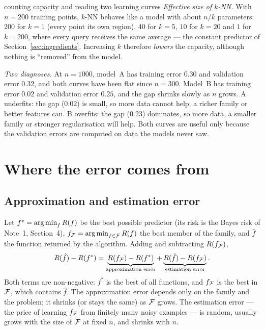 \documentclass[11pt]{article}
\begin{document}
\begin{worked}{counting capacity and reading two learning curves}
\emph{Effective size of $k$-NN.} With $n = 200$ training points, $k$-NN behaves like a model with about $n/k$
parameters: $200$ for $k = 1$ (every point its own region), $40$ for $k = 5$, $10$ for $k = 20$ and $1$ for $k = 200$,
where every query receives the same average --- the constant predictor of Section~\ref{sec:ingredients}. Increasing
$k$ therefore \emph{lowers} the capacity, although nothing is ``removed'' from the model.

\emph{Two diagnoses.} At $n = 1000$, model~A has training error $0.30$ and validation error $0.32$, and both curves
have been flat since $n = 300$. Model~B has training error $0.02$ and validation error $0.25$, and the gap shrinks
slowly as $n$ grows. A underfits: the gap ($0.02$) is small, so more data cannot help; a richer family or better
features can. B overfits: the gap ($0.23$) dominates, so more data, a smaller family or stronger regularisation will
help. Both curves are useful only because the validation errors are computed on data the models never saw.
\end{worked}

\section{Where the error comes from}\label{sec:decomposition}

\subsection{Approximation and estimation error}

Let $f^* = \operatorname*{arg\,min}_f R(f)$ be the best possible predictor (its risk is the Bayes risk of Note~1, Section~4),
$f_{\mathcal{F}} = \operatorname*{arg\,min}_{f \in \mathcal{F}} R(f)$ the best member of the family, and $\hat f$ the function returned by the
algorithm. Adding and subtracting $R(f_{\mathcal{F}})$,
\[
  R(\hat f) - R(f^*) = \underbrace{R(f_{\mathcal{F}}) - R(f^*)}_{\text{approximation error}}
  + \underbrace{R(\hat f) - R(f_{\mathcal{F}})}_{\text{estimation error}} .
\]
Both terms are non-negative: $f^*$ is the best of all functions, and $f_{\mathcal{F}}$ is the best in $\mathcal{F}$, which contains
$\hat f$. The approximation error depends only on the family and the problem; it shrinks (or stays the same) as $\mathcal{F}$
grows. The estimation error --- the price of learning $f_{\mathcal{F}}$ from finitely many noisy examples --- is random,
usually grows with the size of $\mathcal{F}$ at fixed $n$, and shrinks with $n$.
\end{document}
